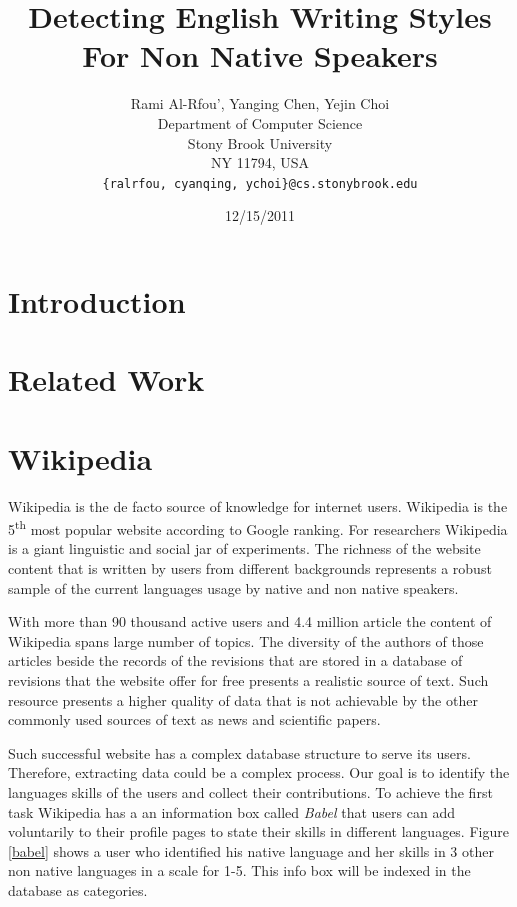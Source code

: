 \documentclass[11pt]{article}
\title{Detecting English Writing Styles For Non Native Speakers}
\author{Rami Al-Rfou', Yanging Chen, Yejin Choi \\
  Department of Computer Science \\
  Stony Brook University \\
  NY 11794, USA \\
  {\tt \{ralrfou, cyanqing, ychoi\}@cs.stonybrook.edu}}
\date{12/15/2011}
\begin{document}
\maketitle
\begin{abstract}
\end{abstract}


\section{Introduction}

\section{Related Work}


\section{Wikipedia}

Wikipedia is the de facto source of knowledge for internet users. Wikipedia is the 5\textsuperscript{th} most popular website according to Google ranking. For researchers Wikipedia is a giant linguistic and social jar of experiments. The richness of the website content that is written by users from different backgrounds represents a robust sample of the current languages usage by native and non native speakers.

With more than 90 thousand active users and 4.4 million article the content of Wikipedia spans large number of topics. The diversity of the authors of those articles beside the records of the revisions that are stored in a database of revisions that the website offer for free presents a realistic source of text. Such resource presents a higher quality of data that is not achievable by the other commonly used sources of text as news and scientific papers.

Such successful website has a complex database structure to serve its users. Therefore, extracting data could be a complex process. Our goal is to identify the languages skills of the users and collect their contributions. To achieve the first task Wikipedia has a an information box called \emph{Babel} that users can add voluntarily to their profile pages to state their skills in different languages. Figure \ref{babel} shows a user who identified his native language and her skills in 3 other non native languages in a scale for 1-5. This info box will be indexed in the database as categories.
\end{document}
